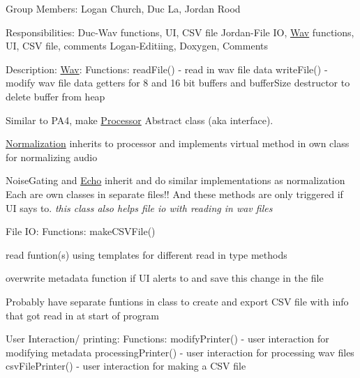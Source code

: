 \label{index_md_README}%
%
 Group Members\+: Logan Church, Duc La, Jordan Rood

Responsibilities\+: Duc-\/\+Wav functions, UI, CSV file Jordan-\/\+File IO, \mbox{\hyperlink{class_wav}{Wav}} functions, UI, CSV file, comments Logan-\/\+Editiing, Doxygen, Comments

Description\+: \mbox{\hyperlink{class_wav}{Wav}}\+: Functions\+: read\+File() -\/ read in wav file data write\+File() -\/ modify wav file data getters for 8 and 16 bit buffers and buffer\+Size destructor to delete buffer from heap


\begin{DoxyEnumerate}
\item Similar to PA4, make \mbox{\hyperlink{class_processor}{Processor}} Abstract class (aka interface).
\item \mbox{\hyperlink{class_normalization}{Normalization}} inherits to processor and implements virtual method in own class for normalizing audio
\item Noise\+Gating and \mbox{\hyperlink{class_echo}{Echo}} inherit and do similar implementations as normalization Each are own classes in separate files!! And these methods are only triggered if UI says to. {\itshape this class also helps file io with reading in wav files}
\end{DoxyEnumerate}

File IO\+: Functions\+: make\+CSVFile()


\begin{DoxyEnumerate}
\item read funtion(s) using templates for different read in type methods
\item overwrite metadata function if UI alerts to and save this change in the file
\item Probably have separate funtions in class to create and export CSV file with info that got read in at start of program
\end{DoxyEnumerate}

User Interaction/ printing\+: Functions\+: modify\+Printer() -\/ user interaction for modifying metadata processing\+Printer() -\/ user interaction for processing wav files csv\+File\+Printer() -\/ user interaction for making a CSV file


